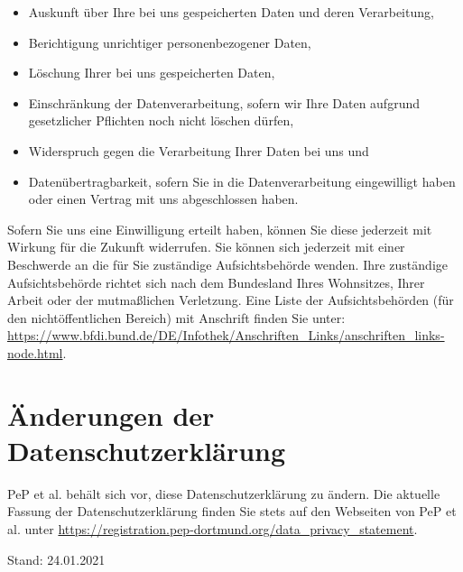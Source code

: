 \documentclass[
  fontsize=12pt,
  paper=a4,
  DIV14,
  parskip,
]{scrartcl}
\begin{document}
\begin{itemize}
  \item Auskunft über Ihre bei uns gespeicherten Daten und deren Verarbeitung,
  \item Berichtigung unrichtiger personenbezogener Daten,
  \item Löschung Ihrer bei uns gespeicherten Daten,
  \item Einschränkung der Datenverarbeitung, sofern wir Ihre Daten aufgrund
        gesetzlicher Pflichten noch nicht löschen dürfen,
  \item Widerspruch gegen die Verarbeitung Ihrer Daten bei uns und
  \item Datenübertragbarkeit, sofern Sie in die Datenverarbeitung
        eingewilligt haben oder einen Vertrag mit uns abgeschlossen haben.
\end{itemize}

Sofern Sie uns eine Einwilligung erteilt haben, können Sie diese jederzeit
mit Wirkung für die Zukunft widerrufen. Sie können sich jederzeit mit einer
Beschwerde an die für Sie zuständige Aufsichtsbehörde wenden. Ihre zuständige
Aufsichtsbehörde richtet sich nach dem Bundesland Ihres Wohnsitzes, Ihrer
Arbeit oder der mutmaßlichen Verletzung. Eine Liste der Aufsichtsbehörden
(für den nichtöffentlichen Bereich) mit Anschrift finden Sie unter: \url{https://www.bfdi.bund.de/DE/Infothek/Anschriften_Links/anschriften_links-node.html}.

\section{Änderungen der Datenschutzerklärung}

PeP et al. behält sich vor, diese Datenschutzerklärung zu ändern. Die
aktuelle Fassung der Datenschutzerklärung finden Sie stets auf den Webseiten
von PeP et al. unter \url{https://registration.pep-dortmund.org/data_privacy_statement}.

Stand: 24.01.2021
\end{document}

